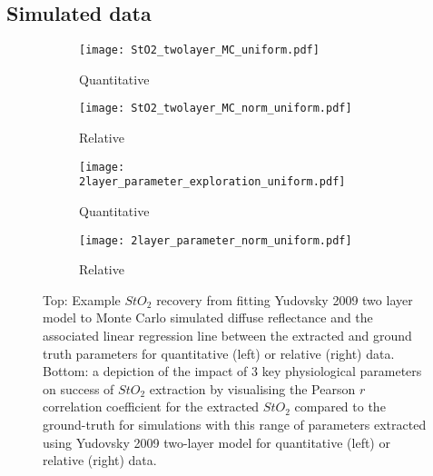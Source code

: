\begin{subappendices}
\subsection{Simulated data}
\begin{figure}[htbp]
    \centering
    \begin{subfigure}{0.49\textwidth}
        \texttt{[image: StO2\_twolayer\_MC\_uniform.pdf]}
        \caption{Quantitative}
        \label{fig:egparamsStO2MCu}
    \end{subfigure}
    \begin{subfigure}{0.49\textwidth}
        \texttt{[image: StO2\_twolayer\_MC\_norm\_uniform.pdf]}
        \caption{Relative}
        \label{fig:egparamsStO2MCnormu}
    \end{subfigure}
    \begin{subfigure}{0.49\textwidth}
        \texttt{[image: 2layer\_parameter\_exploration\_uniform.pdf]}
        \caption{Quantitative}
        \label{fig:egparamsfailureMCu}
    \end{subfigure}
    \begin{subfigure}{0.49\textwidth}
        \texttt{[image: 2layer\_parameter\_norm\_uniform.pdf]}
        \caption{Relative}
        \label{fig:egparamsfailureMCnormu}
    \end{subfigure}
    \caption{Top: Example $StO_2$ recovery from fitting Yudovsky 2009 two layer model to Monte Carlo simulated diffuse reflectance and the associated linear regression line between the extracted and ground truth parameters for quantitative (left) or relative (right) data. Bottom: a depiction of the impact of 3 key physiological parameters on success of $StO_2$ extraction by visualising the Pearson $r$ correlation coefficient for the extracted $StO_2$ compared to the ground-truth for simulations with this range of parameters extracted using Yudovsky 2009 two-layer model for quantitative (left) or relative (right) data.}
    \label{fig:MC2layeruniform}
\end{figure}


\end{subappendices}
